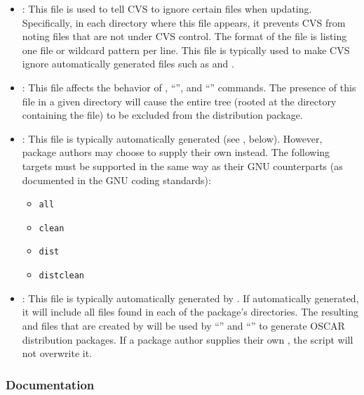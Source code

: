 \begin{itemize}
\item {}: This file is used to tell CVS to ignore
  certain files when updating.  Specifically, in each directory where
  this file appears, it prevents CVS from noting files that are not
  under CVS control.  The format of the file is listing one file or
  wildcard pattern per line.  This file is typically used to make CVS
  ignore automatically generated files such as  and
  .
  
\item {}: This file affects the behavior of
  , ``'', and ``''
  commands.  The presence of this file in a given directory will cause
  the entire tree (rooted at the directory containing the
   file) to be excluded from the distribution
  package.
  
\item {}: This file is typically automatically generated
  (see , below).  However, package authors may
  choose to supply their own  instead.  The following
  targets must be supported in the same way as their GNU
   counterparts (as documented in the GNU coding
  standards):

  \begin{itemize}
  \item {\tt all}
  \item {\tt clean}
  \item {\tt dist}
  \item {\tt distclean}
  \end{itemize}
  
\item {}: This file is typically automatically
  generated by .  If automatically generated, it will
  include all files found in each of the package's directories.  The
  resulting  and  files that are
  created by  will be used by ``'' and
  ``'' to generate OSCAR distribution packages.
  If a package author supplies their own , the
   script will not overwrite it.
\end{itemize}


\subsubsection{Documentation}
\label{sec:design-pkg-docs}

